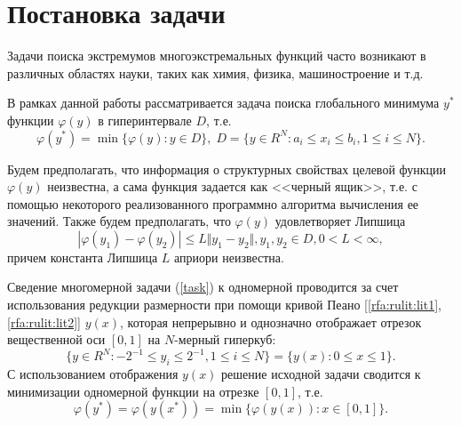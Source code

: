 \documentclass[10pt,a4paper]{book}
\begin{document}
\MakeArticleHeader

\pagebreak



\section{Постановка задачи}



Задачи поиска экстремумов многоэкстремальных функций часто возникают в различных областях науки, таких как химия, физика, машиностроение и т.д. 

В рамках данной работы рассматривается задача поиска глобального минимума $y^*$ функции $\varphi(y)$ в гиперинтервале $D$, т.е. 
\begin{equation}
\label{task}
\varphi(y^*)=\min\{\varphi(y):y\in D\}, \; D=\{y\in R^N:a_i\leqslant x_i\leqslant{b_i}, 1\leqslant{i}\leqslant{N}\}.
\end{equation}

Будем предполагать, что информация о структурных свойствах целевой функции $\varphi(y)$ неизвестна, а сама функция задается как <<черный ящик>>, т.е. с помощью некоторого реализованного программно алгоритма вычисления ее значений. Также будем предполагать, что $\varphi(y)$ удовлетворяет Липшица 
\begin{equation}
\label{lip}
|\varphi(y_1)-\varphi(y_2)|\leqslant L\Vert y_1-y_2\Vert,y_1,y_2\in D,0<L<\infty,
\end{equation}
причем константа Липшица $L$ априори неизвестна.


Сведение многомерной задачи (\ref{task}) к одномерной проводится за счет использования редукции размерности при помощи кривой Пеано [\ref{rfa:rulit:lit1}, \ref{rfa:rulit:lit2}] $y(x)$, которая непрерывно и однозначно отображает отрезок вещественной оси $[0,1]$ на $N$-мерный гиперкуб:
\begin{equation}
\label{cube}
\lbrace y\in R^N:-2^{-1}\leqslant y_i\leqslant 2^{-1}, 1\leqslant i\leqslant N\rbrace=\{y(x): 0\leqslant x\leqslant 1\}.
\end{equation}
С использованием отображения $y(x)$ решение исходной задачи сводится к минимизации одномерной функции на отрезке $[0,1]$, т.е.
\begin{equation}
\label{oneDimTask}
\varphi(y^*)=\varphi(y(x^*))=\min\{\varphi(y(x)): x\in [0,1]\}.
\end{equation}
 
\end{document}
